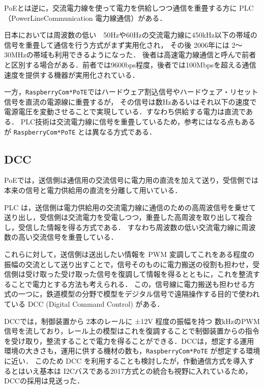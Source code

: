 PoEとは逆に，交流電力線を使って電力を供給しつつ通信を重畳する方に PLC（PowerLineCommunication 電力線通信）がある．


日本においては周波数の低い　50Hzや60Hzの交流電力線に450kHz以下の帯域の信号を重畳して通信を行う方式がまず実用化され，
その後 2006年には 2〜30MHzの帯域も利用できるようになった．
後者は高速電力線通信と呼んで前者と区別する場合がある．前者では9600bps程度，後者では100Mbpsを超える通信速度を提供する機器が実用化されている．

一方，{\tt Raspberry\-Com*PoTE}ではハードウェア割込信号やハードウェア・リセット信号を直流の電源線に重畳するが，
その信号は数Hzあるいはそれ以下の速度で電源電圧を変動させることで実現している．すなわち供給する電力は直流である．
PLC技術は交流電力線に信号を重畳しているため，参考にはなる点もあるが {\tt Raspberry\-Com*PoTE} とは異なる方式である．


\subsection{DCC}



PoEでは，送信側は通信用の交流信号に電力用の直流を加えて送り，受信側では本来の信号と電力供給用の直流を分離して用いている．

PLC は，送信側は電力供給用の交流電力線に通信のための高周波信号を乗せて送り出し，受信側は交流電力を受電しつつ，重畳した高周波を取り出して複合し，受信した情報を得る方式である．
すなわち周波数の低い交流電力線に周波数の高い交流信号を重畳している．

これらに対して，送信側は送出したい情報を PWM 変調してこれをある程度の振幅の交流として送り出すことで，信号そのものに電力搬送の役割も担わせ，受信側は受け取った受け取った信号を復調して情報を得るとともに，これを整流することで電力とする方法も考えられる．
この，信号線に電力搬送も担わせる方式の一つに，鉄道模型の分野で模型をデジタル信号で遠隔操作する目的で使われている DCC (Digital Command Control) がある\cite{misc:DCC}．


DCCでは，制御装置から 2本のレールに ±12V 程度の振幅を持つ 数kHzのPWM信号を流しており，レール上の模型はこれを復調することで制御装置からの指令を受け取り，整流することで電力を得ることができる．DCCは，想定する運用環境の大きさも，運用に供する機材の数も，{\tt Raspberry\-Com*PoTE} が想定する環境に近い．
このため DCC を利用することも検討したが，作動通信方式を導入するとはいえ基本は I2Cバスである2017方式との統合も視野に入れているため，DCCの採用は見送った．


